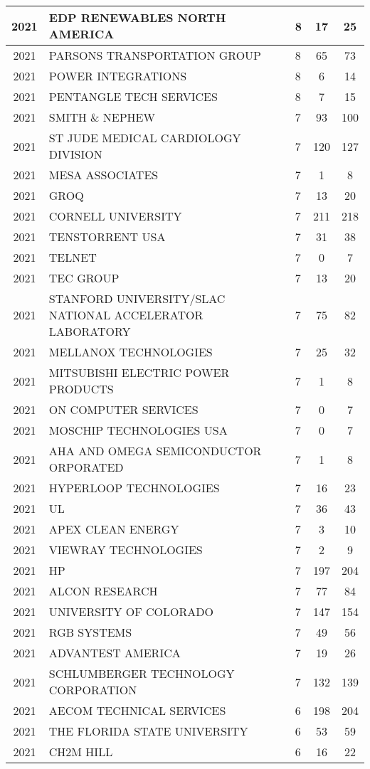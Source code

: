 \documentclass{article}%
\begin{document}
\begin{longtable}{c|p{20em}|p{5em}|c|c}
\hline%
2021&EDP RENEWABLES NORTH AMERICA&8&17&25\\%
\hline%
2021&PARSONS TRANSPORTATION GROUP&8&65&73\\%
\hline%
2021&POWER INTEGRATIONS&8&6&14\\%
\hline%
2021&PENTANGLE TECH SERVICES&8&7&15\\%
\hline%
2021&SMITH \& NEPHEW&7&93&100\\%
\hline%
2021&ST JUDE MEDICAL CARDIOLOGY DIVISION&7&120&127\\%
\hline%
2021&MESA ASSOCIATES&7&1&8\\%
\hline%
2021&GROQ&7&13&20\\%
\hline%
2021&CORNELL UNIVERSITY&7&211&218\\%
\hline%
2021&TENSTORRENT USA&7&31&38\\%
\hline%
2021&TELNET&7&0&7\\%
\hline%
2021&TEC GROUP&7&13&20\\%
\hline%
2021&STANFORD UNIVERSITY/SLAC NATIONAL ACCELERATOR LABORATORY&7&75&82\\%
\hline%
2021&MELLANOX TECHNOLOGIES&7&25&32\\%
\hline%
2021&MITSUBISHI ELECTRIC POWER PRODUCTS&7&1&8\\%
\hline%
2021&ON COMPUTER SERVICES&7&0&7\\%
\hline%
2021&MOSCHIP TECHNOLOGIES USA&7&0&7\\%
\hline%
2021&AHA AND OMEGA SEMICONDUCTOR ORPORATED&7&1&8\\%
\hline%
2021&HYPERLOOP TECHNOLOGIES&7&16&23\\%
\hline%
2021&UL&7&36&43\\%
\hline%
2021&APEX CLEAN ENERGY&7&3&10\\%
\hline%
2021&VIEWRAY TECHNOLOGIES&7&2&9\\%
\hline%
2021&HP&7&197&204\\%
\hline%
2021&ALCON RESEARCH&7&77&84\\%
\hline%
2021&UNIVERSITY OF COLORADO&7&147&154\\%
\hline%
2021&RGB SYSTEMS&7&49&56\\%
\hline%
2021&ADVANTEST AMERICA&7&19&26\\%
\hline%
2021&SCHLUMBERGER TECHNOLOGY CORPORATION&7&132&139\\%
\hline%
2021&AECOM TECHNICAL SERVICES&6&198&204\\%
\hline%
2021&THE FLORIDA STATE UNIVERSITY&6&53&59\\%
\hline%
2021&CH2M HILL&6&16&22\\%

\end{longtable}
\end{document}

